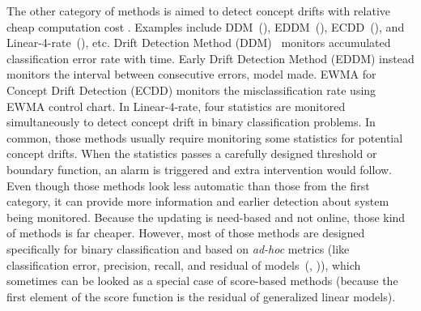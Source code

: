 \documentclass[twoside,11pt]{article}
\begin{document}
The other category of methods is aimed to detect concept drifts with relative cheap computation cost . Examples include DDM~(\cite{gama2004learning}), EDDM~(\cite{baena2006early}), ECDD~(\cite{ross2012exponentially}), and Linear-4-rate~(\cite{wang2015concept}), etc.  Drift Detection Method (DDM)~\cite{gama2004learning} monitors accumulated classification error rate with time. Early Drift Detection Method (EDDM) instead monitors the interval between consecutive errors, model made. EWMA for Concept Drift Detection (ECDD) monitors the misclassification rate using EWMA control chart. In Linear-4-rate, four statistics are monitored simultaneously to detect concept drift in binary classification problems. In common, those methods usually require monitoring some statistics for potential concept drifts. When the statistics passes a carefully designed threshold or boundary function, an alarm is triggered and extra intervention would follow. Even though those methods look less automatic than those from the first category, it can provide more information and earlier detection about system being monitored. Because the updating is need-based and not online, those kind of methods is far cheaper. However, most of those methods are designed specifically for binary classification and based on \textit{ad-hoc}  metrics (like classification error, precision, recall, and residual of models~(\cite{barros2018large}, \cite{wang2015concept})), which sometimes can be looked as a special case of score-based methods (because the first element of the score function is the residual of generalized linear models).
\end{document}
